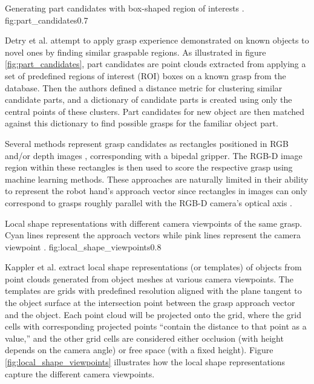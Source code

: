              {Generating part candidates with box-shaped region of interests \cite{Detry2012}.}
             {fig:part_candidates}{0.7\textwidth}

Detry et al. \cite{Detry2012} attempt to apply grasp experience demonstrated on known objects to novel ones by finding
similar graspable regions. As illustrated in figure \ref{fig:part_candidates}, part candidates are point clouds
extracted from applying a set of predefined regions of interest (ROI) boxes on a known grasp from the database. Then the
authors defined a distance metric for clustering similar candidate parts, and a dictionary of candidate parts is created
using only the central points of these clusters. Part candidates for new object are then matched against this dictionary
to find possible grasps for the familiar object part.

Several methods represent grasp candidates as rectangles positioned in RGB and/or depth images
\cite{lenz2015,jiang2011}, corresponding with a bipedal gripper. The RGB-D image region within these rectangles is then
used to score the respective grasp using machine learning methods. These approaches are naturally limited in their
ability to represent the robot hand's approach vector since rectangles in images can only correspond to grasps roughly
parallel with the RGB-D camera's optical axis \cite{Gualtieri2016}.

             {Local shape representations with different camera viewpoints of the same grasp. Cyan lines represent the
              approach vectors while pink lines represent the camera viewpoint \cite{Kappler2015}.}
             {fig:local_shape_viewpoints}{0.8\textwidth}

Kappler et al. \cite{Kappler2015} extract local shape representations (or templates) of objects from point clouds
generated from object meshes at various camera viewpoints. The templates are grids with predefined resolution
aligned with the plane tangent to the object surface at the intersection point between the grasp approach vector and the
object. Each point cloud will be projected onto the grid, where the grid cells with corresponding projected points
``contain the distance to that point as a value,'' and the other grid cells are considered either occlusion
(with height depends on the camera angle) or free space (with a fixed height). Figure \ref{fig:local_shape_viewpoints}
illustrates how the local shape representations capture the different camera viewpoints.

